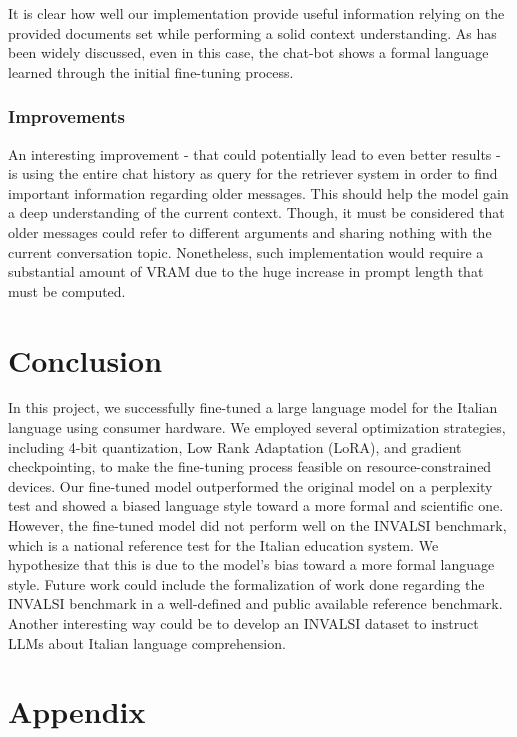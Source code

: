 \documentclass{article}
\begin{document}
	It is clear how well our implementation provide useful information relying on the provided documents set while performing a solid context understanding. 
	As has been widely discussed, even in this case, the chat-bot shows a formal language learned through the initial fine-tuning process.
	
	\subsubsection{Improvements}
	An interesting improvement - that could potentially lead to even better results - is using the entire chat history as query for the retriever system in order to find important information regarding older messages. 
	This should help the model gain a deep understanding of the current context. 
	Though, it must be considered that older messages could refer to different arguments and sharing nothing with the current conversation topic.  
	Nonetheless, such implementation would require a substantial amount of VRAM due to the huge increase in prompt length that must be computed.
	
	 
	\section{Conclusion}
	In this project, we successfully fine-tuned a large language model for the Italian language using consumer hardware. We employed several optimization strategies, including 4-bit quantization, Low Rank Adaptation (LoRA), and gradient checkpointing, to make the fine-tuning process feasible on resource-constrained devices. Our fine-tuned model outperformed the original model on a perplexity test and showed a biased language style toward a more formal and scientific one. 
	However, the fine-tuned model did not perform well on the INVALSI benchmark, which is a national reference test for the Italian education system. We hypothesize that this is due to the model's bias toward a more formal language style.
	Future work could include the formalization of work done regarding the INVALSI benchmark in a well-defined and public available reference benchmark.
	Another interesting way could be to develop an INVALSI dataset to instruct LLMs about Italian language comprehension. 
	
	\section*{Appendix}
	
	\appendix
	
\end{document}
